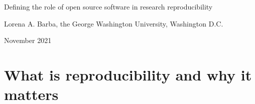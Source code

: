 \documentclass{statement}
\newlength{\up}
\begin{document}

\renewcommand{\thepage} {\arabic{page}}

\thispagestyle{empty}

{ \Huge Defining the role of open source software in research reproducibility} 
\medskip

Lorena A. Barba, the George Washington University, Washington D.C. 

November 2021



\vspace{1cm}

\begin{abstract}
Reproducibility is inseparable from transparency, as sharing data, code and computational environment is a pre-requisite for being able to retrace the steps of producing the research results. 
Others have made the case that this artifact sharing should adopt appropriate licensing schemes that permit reuse, modification and redistribution. 
I make a new proposal for the role of open source software, stemming from the lessons it teaches about distributed collaboration and a commitment-based culture. 
Reviewing the defining features of open source software (licensing, development, communities), I look for explanation of its success from the perspectives of connectivism---a learning theory for the digital age---and the language-action framework of Winograd and Flores. 
I contend that reproducibility engenders trust, which we routinely build in community via conversations, and the practices of open source software help us to learn how to be more effective learning (discovering) together.
\end{abstract}

\section*{What is reproducibility and why it matters}
\vspace{\up}
\end{document}
